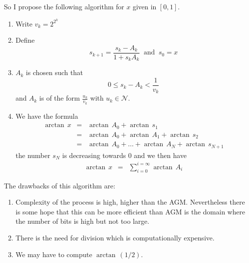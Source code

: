 \documentclass[12pt]{amsart}
\def\N{{\mathcal N}}
\begin{document}
So I propose the following algorithm for $x$ given in $[0,1]$.
\begin{enumerate}
\item Write $v_k=2^{2^k}$
\item Define 
\begin{equation*}
s_{k+1}=\frac{s_k-A_k}{1+s_kA_k}\;\;\mbox{and}\;\;s_0=x
\end{equation*}
\item $A_k$ is chosen such that
\begin{equation*}
0\leq s_k-A_k<\frac{1}{v_k}
\end{equation*}
and $A_k$ is of the form $\frac{u_k}{v_k}$ with $u_k\in\N$.
\item We have the formula
\begin{equation*}
\begin{array}{rcl}
\arctan\,x
&=&\arctan\,A_0+\arctan\,s_1\\
&=&\arctan\,A_0+\arctan\,A_1+\arctan\,s_2\\
&=&\arctan\,A_0+\dots+\arctan\,A_N+\arctan\,s_{N+1}
\end{array}
\end{equation*}
the number $s_N$ is decreasing towards $0$ and we then have
\begin{equation*}
\begin{array}{rcl}
\arctan\,x&=&\sum_{i=0}^{i=\infty}\arctan\,A_i
\end{array}
\end{equation*}

\end{enumerate}
The drawbacks of this algorithm are:
\begin{enumerate}
\item Complexity of the process is high, higher than the AGM. Nevertheless there is some hope that this can be more efficient than AGM is the domain where the number of bits is high but not too large.
\item There is the need for division which is computationally expensive.
\item We may have to compute $\arctan\,(1/2)$.
\end{enumerate}
\end{document}
